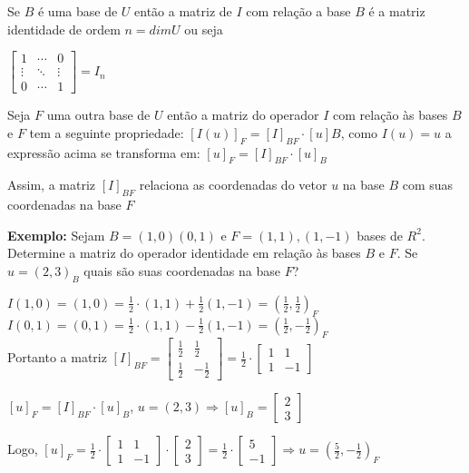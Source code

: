 \documentclass[10pt,landscape]{article}
\begin{document}
\begin{multicols}{3}
Se $B$ é uma base de $U$ então a matriz de $I$ com relação a base $B$ é a matriz identidade de ordem $n=dimU$ ou seja
\begin{center}
$\begin{bmatrix} 1&\cdots &0 \\ \vdots&\ddots&\vdots \\ 0&\cdots &1 \end{bmatrix}=I_n$
\end{center}

Seja $F$ uma outra base de $U$ então a matriz do operador $I$ com relação às bases $B$ e $F$ tem a seguinte propriedade: 
$[I(u)]_F=[I]_{BF}\cdot[u]B$, como $I(u)=u$ a expressão acima se transforma em: $[u]_F=[I]_{BF}\cdot[u]_B$

Assim, a matriz $[I]_{BF}$ relaciona as coordenadas do vetor $u$ na base $B$ com suas coordenadas na base $F$

\textbf{Exemplo:} Sejam $B={(1,0)(0,1)}$ e $F={(1,1), (1,-1)}$ bases de $R^2$. Determine a matriz do operador identidade em relação às bases $B$ e $F$. Se $u=(2,3)_B$ quais são suas coordenadas na base $F$?

$I(1,0)=(1,0)=\frac{1}{2}\cdot(1,1)+\frac{1}{2}(1,-1)=\left(\frac{1}{2},\frac{1}{2}\right)_F$\\
$I(0,1)=(0,1)=\frac{1}{2}\cdot(1,1)-\frac{1}{2}(1,-1)=\left(\frac{1}{2},-\frac{1}{2}\right)_F$\\

Portanto a matriz $[I]_{BF}=\begin{bmatrix} \frac{1}{2}&\frac{1}{2}\\ \frac{1}{2}&-\frac{1}{2}\end{bmatrix}=
\frac{1}{2}\cdot\begin{bmatrix} 1&1 \\ 1&-1 \end{bmatrix}$

$[u]_F=[I]_{BF}\cdot [u]_B$, $u=(2,3)\Rightarrow [u]_B=\begin{bmatrix} 2\\3 \end{bmatrix}$ 

Logo, $[u]_F=\frac{1}{2}\cdot\begin{bmatrix} 1&1 \\ 1&-1 \end{bmatrix}\cdot \begin{bmatrix} 2\\3 \end{bmatrix}=\frac{1}{2}\cdot \begin{bmatrix} 5\\-1 \end{bmatrix}\Rightarrow u = \left(\frac{5}{2},-\frac{1}{2}\right)_F$


\end{multicols}
\end{document}
